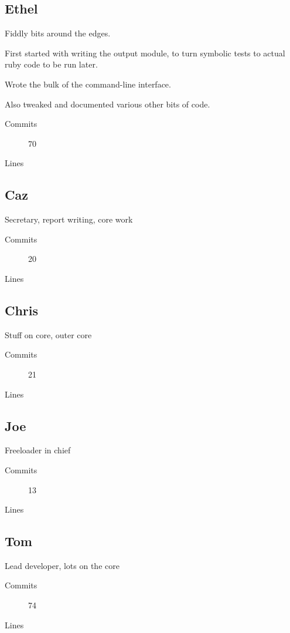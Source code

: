 \subsection{Ethel}
Fiddly bits around the edges.

First started with writing the output module, to turn symbolic tests to actual ruby code to be run later.

Wrote the bulk of the command-line interface.

Also tweaked and documented various other bits of code.
\begin{description}
\item[Commits] 70
\item[Lines]
\end{description}

\subsection{Caz}
Secretary, report writing, core work
\begin{description}
\item[Commits] 20
\item[Lines]
\end{description}

\subsection{Chris}
Stuff on core, outer core
\begin{description}
\item[Commits] 21
\item[Lines]
\end{description}

\subsection{Joe}
Freeloader in chief
\begin{description}
\item[Commits] 13
\item[Lines]
\end{description}

\subsection{Tom}
Lead developer, lots on the core
\begin{description}
\item[Commits] 74
\item[Lines]
\end{description}
